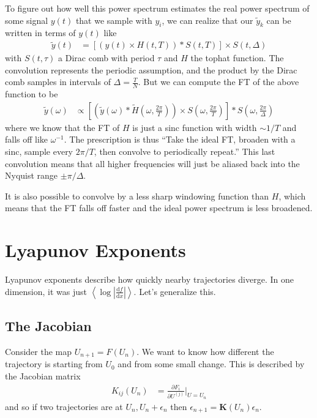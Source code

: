 \documentclass[12pt]{article}
\newcommand{\rd}[2]{\frac{\mathrm{d}#1}{\mathrm{d}#2}}
\newcommand{\pd}[2]{\frac{\partial#1}{\partial#2}}
\newcommand{\abs}[1]{\left|#1\right|}
\newcommand{\expvalue}[1]{\left<#1\right>}
\begin{document}
To figure out how well this power spectrum estimates the real power spectrum of
some signal $y(t)$ that we sample with $y_i$, we can realize that our
$\tilde{y}_k$ can be written in terms of $y(t)$ like
\begin{align}
    \tilde{y}(t) &= \left[ \left( y(t) \times H(t,T) \right) * S(t,T) \right]
    \times S(t,\Delta)
\end{align}
with $S(t,\tau)$ a Dirac comb with period $\tau$ and $H$ the tophat function.
The convolution represents the periodic assumption, and the product by the Dirac
comb samples in intervals of $\Delta = \frac{T}{N}$. But we can compute the FT
of the above function to be
\begin{align}
    \tilde{y}(\omega) &\propto \left[
        \left(
            \tilde{y}(\omega) * \tilde{H}\left( \omega, \frac{2\pi}{T} \right)
        \right) \times S\left( \omega,\frac{2\pi}{T} \right)
    \right] * S\left( \omega, \frac{2\pi}{\Delta} \right)
\end{align}
where we know that the FT of $H$ is just a sinc function with width $\sim 1/T$
and falls off like $\omega^{-1}$.  The prescription is thus ``Take the ideal FT,
broaden with a sinc, sample every $2\pi/T$, then convolve to periodically
repeat.'' This last convolution means that all higher frequencies will just be
aliased back into the Nyquist range $\pm \pi/\Delta$.

It is also possible to convolve by a less sharp windowing function than $H$,
which means that the FT falls off faster and the ideal power spectrum is less
broadened.

\clearpage

\section{Lyapunov Exponents}

Lyapunov exponents describe how quickly nearby trajectories diverge. In one
dimension, it was just $\expvalue{\log \abs{\rd{f}{x}}}$. Let's generalize this.

\subsection{The Jacobian}

Consider the map $U_{n+1} = F(U_n)$. We want to know how different the
trajectory is starting from $U_0$ and from some small change. This is described
by the Jacobian matrix
\begin{align}
    K_{ij}(U_n) &= \pd{F_i}{U^{(j)}}\Bigg|_{U=U_n}
\end{align}
and so if two trajectories are at $U_n, U_{n} + \epsilon_n$ then $\epsilon_{n+1}
= \mathbf{K}(U_n)\epsilon_n$.
\end{document}
